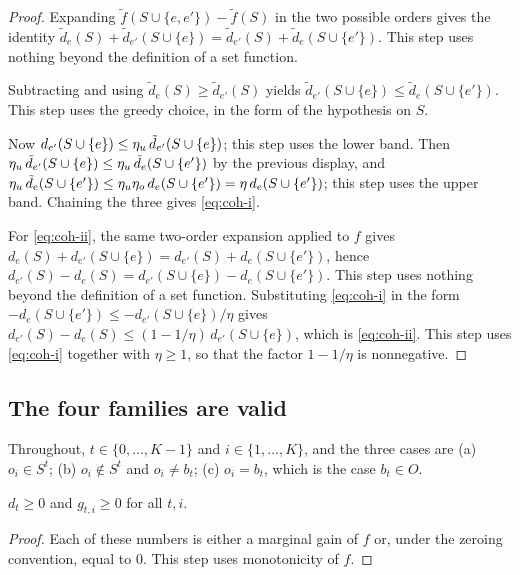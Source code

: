 \begin{proof}
Expanding $\tilde f(S \cup \{e,e'\}) - \tilde f(S)$ in the two possible orders
gives the identity
$\tilde d_{e}(S) + \tilde d_{e'}(S \cup \{e\})
 = \tilde d_{e'}(S) + \tilde d_{e}(S \cup \{e'\})$.
This step uses nothing beyond the definition of a set function.

Subtracting and using $\tilde d_{e}(S) \ge \tilde d_{e'}(S)$ yields
$\tilde d_{e'}(S \cup \{e\}) \le \tilde d_{e}(S \cup \{e'\})$.
This step uses the greedy choice, in the form of the hypothesis on $S$.

Now $d_{e'}(S \cup \{e\}) \le \eta_{u}\, \tilde d_{e'}(S \cup \{e\})$; this step
uses the lower band. Then
$\eta_{u}\, \tilde d_{e'}(S \cup \{e\}) \le \eta_{u}\, \tilde d_{e}(S \cup \{e'\})$
by the previous display, and
$\eta_{u}\, \tilde d_{e}(S \cup \{e'\}) \le \eta_{u} \eta_{o}\, d_{e}(S \cup \{e'\})
 = \eta\, d_{e}(S \cup \{e'\})$; this step uses the upper band. Chaining the
three gives \eqref{eq:coh-i}.

For \eqref{eq:coh-ii}, the same two-order expansion applied to $f$ gives
$d_{e}(S) + d_{e'}(S \cup \{e\}) = d_{e'}(S) + d_{e}(S \cup \{e'\})$, hence
$d_{e'}(S) - d_{e}(S) = d_{e'}(S \cup \{e\}) - d_{e}(S \cup \{e'\})$. This step
uses nothing beyond the definition of a set function. Substituting
\eqref{eq:coh-i} in the form
$- d_{e}(S \cup \{e'\}) \le - d_{e'}(S \cup \{e\})/\eta$ gives
$d_{e'}(S) - d_{e}(S) \le (1 - 1/\eta)\, d_{e'}(S \cup \{e\})$, which is
\eqref{eq:coh-ii}. This step uses \eqref{eq:coh-i} together with $\eta \ge 1$,
so that the factor $1 - 1/\eta$ is nonnegative.
\end{proof}

\subsection{The four families are valid}

Throughout, $t \in \{0, \dots, K-1\}$ and $i \in \{1, \dots, K\}$, and the three
cases are
(a) $o_{i} \in S^{t}$;
(b) $o_{i} \notin S^{t}$ and $o_{i} \ne b_{t}$;
(c) $o_{i} = b_{t}$, which is the case $b_{t} \in O$.

\begin{lemma}
\label{lem:sign}
$d_{t} \ge 0$ and $g_{t,i} \ge 0$ for all $t, i$.
\end{lemma}

\begin{proof}
Each of these numbers is either a marginal gain of $f$ or, under the zeroing
convention, equal to $0$. This step uses monotonicity of $f$.
\end{proof}

